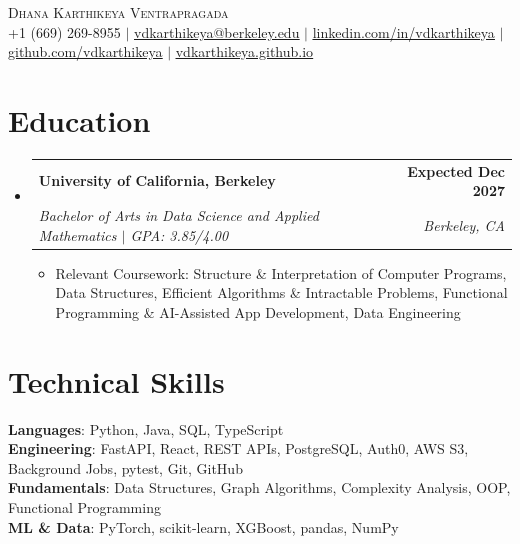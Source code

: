 \documentclass[letterpaper,11pt]{article}
\makeatletter
\newcommand{\resumeItem}[1]{%
  \item\small{{#1\vspace{-2pt}}}%
}
\newcommand{\resumeSubheading}[4]{
  \vspace{-2pt}\item
    \begin{tabular*}{1.0\textwidth}[t]{l@{\extracolsep{\fill}}r}
      \textbf{#1} & \textbf{\small #2} \\
      \textit{\small#3} & \textit{\small #4} \\
    \end{tabular*}\vspace{-7pt}
}
\newcommand{\resumeSubHeadingListStart}{\begin{itemize}[leftmargin=0.0in, label={}]}
\newcommand{\resumeSubHeadingListEnd}{\end{itemize}}
\newcommand{\resumeItemListStart}{\begin{itemize}[itemsep=2.5pt, topsep=3pt]}
\newcommand{\resumeItemListEnd}{\end{itemize}\vspace{-4pt}}
\makeatother
\begin{document}
\begin{center}
    {\Huge \scshape Dhana Karthikeya Ventrapragada} \\ \vspace{1pt}
        \footnotesize
    +1 (669) 269-8955 $|$
    \href{mailto:vdkarthikeya@berkeley.edu}{\uline{vdkarthikeya@berkeley.edu}} $|$
    \href{https://www.linkedin.com/in/vdkarthikeya/}{\uline{linkedin.com/in/vdkarthikeya}} $|$
    \href{https://github.com/vdkarthikeya}{\uline{github.com/vdkarthikeya}} $|$
    \href{https://vdkarthikeya.github.io}{\uline{vdkarthikeya.github.io}}
    \vspace{-8pt}
\end{center}

\section{Education}
\resumeSubHeadingListStart

\resumeSubheading
{University of California, Berkeley}{Expected Dec 2027}
{Bachelor of Arts in Data Science and Applied Mathematics \;$|$\; GPA: 3.85/4.00}{Berkeley, CA}

\vspace{-6pt}
\resumeItemListStart
\resumeItem{Relevant Coursework: Structure \& Interpretation of Computer Programs, Data Structures, Efficient Algorithms \& Intractable Problems, Functional Programming \& AI-Assisted App Development, Data Engineering}
\resumeItemListEnd
\resumeSubHeadingListEnd
\vspace{-14pt}

\section{Technical Skills}
 \begin{itemize}[leftmargin=0.15in, label={}, itemsep=3pt]
    \small{\item{
     \textbf{Languages}{: Python, Java, SQL, TypeScript} \\[2pt]
     \textbf{Engineering}{: FastAPI, React, REST APIs, PostgreSQL, Auth0, AWS S3, Background Jobs, pytest, Git, GitHub} \\[2pt]
     \textbf{Fundamentals}{: Data Structures, Graph Algorithms, Complexity Analysis, OOP, Functional Programming} \\[2pt]
     \textbf{ML \& Data}{: PyTorch, scikit-learn, XGBoost, pandas, NumPy}
    }}
 \end{itemize}
 \vspace{-15pt}
\end{document}
